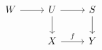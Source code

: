 \documentclass[12pt]{standalone}
\begin{document}
        $$

\begin{tikzcd}
W \ar[r] & U \ar[r] \ar[d] & S \ar[d] \\
& X \ar[r,"f"] & Y 
\end{tikzcd}
        $$
        
\end{document}
